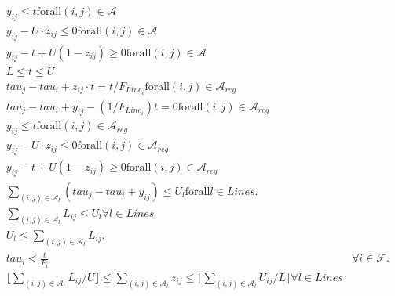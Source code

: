 \begin{align}
  & y_{i j} \leq t \text{for} \text{all} \left(i , j\right) \in \mathcal{A} \tag{eq\_0027} \\
  & y_{i j} - U \cdot z_{i j} \leq 0 \text{for} \text{all} \left(i , j\right) \in \mathcal{A} \tag{eq\_0028} \\
  & y_{i j} - t + U \left(1 - z_{i j}\right) \geq 0 \text{for} \text{all} \left(i , j\right) \in \mathcal{A} \tag{eq\_0029} \\
  & L \leq t \leq U \tag{eq\_0030} \\
  & \mathit{tau}_{j} - \mathit{tau}_{i} + z_{i j} \cdot t = t / F_{L i n e_{i}} \text{for} \text{all} \left(i , j\right) \in \mathcal{A}_{r e g} \tag{eq\_0036} \\
  & \mathit{tau}_{j} - \mathit{tau}_{i} + y_{i j} - \left(1 / F_{L i n e_{i}}\right) t = 0 \text{for} \text{all} \left(i , j\right) \in \mathcal{A}_{r e g} \tag{eq\_0037} \\
  & y_{i j} \leq t \text{for} \text{all} \left(i , j\right) \in \mathcal{A}_{r e g} \tag{eq\_0038} \\
  & y_{i j} - U \cdot z_{i j} \leq 0 \text{for} \text{all} \left(i , j\right) \in \mathcal{A}_{r e g} \tag{eq\_0039} \\
  & y_{i j} - t + U \left(1 - z_{i j}\right) \geq 0 \text{for} \text{all} \left(i , j\right) \in \mathcal{A}_{r e g} \tag{eq\_0040} \\
  & \sum_{\left(i , j\right) \in \mathcal{A}_{l}} \left(\mathit{tau}_{j} - \mathit{tau}_{i} + y_{i j}\right) \leq U_{l} \text{for} \text{all} l \in \mathit{Lines} . \tag{eq\_0043} \\
  & \sum_{\left(i , j\right) \in \mathcal{A}_{l}} L_{i j} \leq U_{l} \forall l \in \mathit{Lines} \tag{eq\_0044} \\
  & U_{l} \leq \sum_{\left(i , j\right) \in \mathcal{A}_{l}} L_{i j} . \tag{eq\_0045} \\
  &  \mathit{tau}_{i} < \frac{t}{F_{i}} & \forall i \in \mathcal{F} .  \tag{eq\_0046} \\
  & \lfloor \sum_{\left(i , j\right) \in \mathcal{A}_{l}} L_{i j} / U \rfloor \leq \sum_{\left(i , j\right) \in \mathcal{A}_{l}} z_{i j} \leq \lceil \sum_{\left(i , j\right) \in \mathcal{A}_{l}} U_{i j} / L \rceil \forall l \in \mathit{Lines} \tag{eq\_0047} \\
\end{align}
